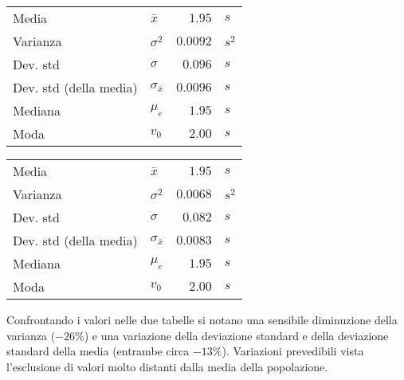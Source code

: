 \documentclass{article}
\begin{document}
	\vspace{0.8cm}
	\begin{minipage}[c]{0.45\textwidth}
		\centering
		\begin{tabular}{llrl}
			Media                       & $\bar{x}$             & $1.95$        & $s$       \\
			Varianza                    & $\sigma ^ 2$          & $0.0092$     & $s^2$  \\
			Dev. std                    & $\sigma$              & $0.096$      & $s$   \\
			Dev. std (della media)      & $\sigma_{\bar{x}}$    & $0.0096$     & $s$    \\
			Mediana                     & $\mu_e$               & $1.95$        &  $s$      \\
			Moda                        & $v_0$                 & $2.00$        & $s$
		\end{tabular}
	\end{minipage}
	\begin{minipage}[c]{0.5\textwidth}
		\centering
		\begin{tabular}{llrl}
			Media                       & $\bar{x}$             & $1.95$        & $s$       \\
			Varianza                    & $\sigma ^ 2$          & $0.0068$     & $s^2$  \\
			Dev. std                    & $\sigma$              & $0.082$      & $s$   \\
			Dev. std (della media)      & $\sigma_{\bar{x}}$    & $0.0083$     & $s$    \\
			Mediana                     & $\mu_e$               & $1.95$        &  $s$      \\
			Moda                        & $v_0$                 & $2.00$        & $s$
		\end{tabular}
	\end{minipage}
	\vspace{0.8cm}
	
	\noindent
	Confrontando i valori nelle due tabelle si notano una sensibile diminuzione della varianza ($-26 \%$) e una variazione della deviazione standard e della deviazione standard della media (entrambe circa $-13 \%$). Variazioni prevedibili vista l'esclusione di valori molto distanti dalla media della popolazione. 
	
\end{document}
